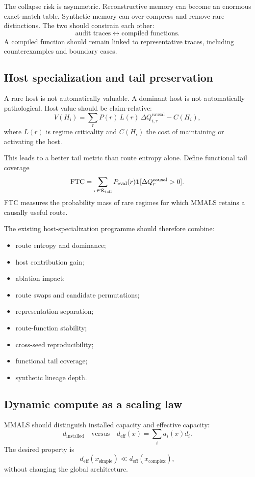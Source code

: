 The collapse risk is asymmetric. Reconstructive memory can become an enormous exact-match table. Synthetic memory can over-compress and remove rare distinctions. The two should constrain each other:
\[
\text{audit traces}
\leftrightarrow
\text{compiled functions}.
\]
A compiled function should remain linked to representative traces, including counterexamples and boundary cases.

\subsection{Host specialization and tail preservation}

A rare host is not automatically valuable. A dominant host is not automatically pathological. Host value should be claim-relative:
\[
V(H_i)
=\sum_r P(r)\,L(r)\,\Delta Q_{i,r}^{\mathrm{causal}}-C(H_i),
\]
where $L(r)$ is regime criticality and $C(H_i)$ the cost of maintaining or activating the host.

This leads to a better tail metric than route entropy alone. Define functional tail coverage
\[
\mathrm{FTC}
=\sum_{r\in\mathcal R_{\mathrm{tail}}}
P_{\mathrm{eval}}(r)
\mathbf{1}[\Delta Q_r^{\mathrm{causal}}>0].
\]
FTC measures the probability mass of rare regimes for which MMALS retains a causally useful route.

The existing host-specialization programme should therefore combine:

\begin{itemize}[leftmargin=*]
  \item route entropy and dominance;
  \item host contribution gain;
  \item ablation impact;
  \item route swaps and candidate permutations;
  \item representation separation;
  \item route-function stability;
  \item cross-seed reproducibility;
  \item functional tail coverage;
  \item synthetic lineage depth.
\end{itemize}

\subsection{Dynamic compute as a scaling law}

MMALS should distinguish installed capacity and effective capacity:
\[
d_{\mathrm{installed}}
\quad\text{versus}\quad
 d_{\mathrm{eff}}(x)=\sum_i a_i(x)d_i.
\]
The desired property is
\[
d_{\mathrm{eff}}(x_{\mathrm{simple}})
\ll
d_{\mathrm{eff}}(x_{\mathrm{complex}}),
\]
without changing the global architecture.


